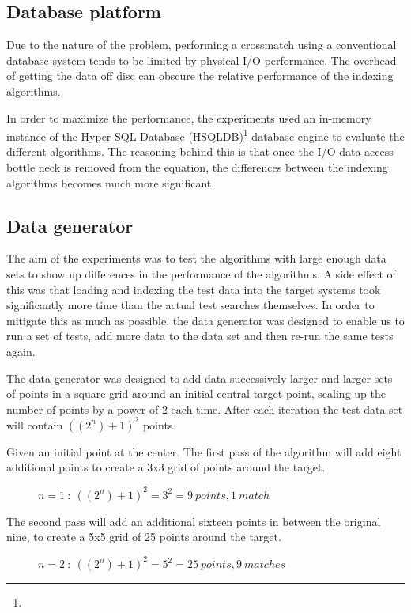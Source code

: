 \documentclass{article}
\newcommand{\hsqldb} {HSQLDB\xspace}
\newcommand{\crossmatch} {crossmatch\xspace}
\newcommand{\footurl}[1] {\footnote{\burl{#1}}}
\begin{document}
\subsection{Database platform}
\label{database-platform}

Due to the nature of the problem, performing a \crossmatch using a conventional database system tends to be limited by physical I/O performance. The overhead of getting the data off disc can obscure the relative performance of the indexing algorithms.

In order to maximize the performance, the experiments used an in-memory instance of the Hyper SQL Database (\hsqldb)\footurl{http://hsqldb.org/} database engine to evaluate the different algorithms. The reasoning behind this is that once the I/O data access bottle neck is removed from the equation, the differences between the indexing algorithms becomes much more significant.

\subsection{Data generator}
\label{test-data-generator}

The aim of the experiments was to test the algorithms with large enough data sets to show up differences in the performance of the algorithms.
A side effect of this was that loading and indexing the test data into the target systems took significantly more time than the actual test searches themselves.
In order to mitigate this as much as possible, the data generator was designed to enable us to run a set of tests, add more data to the data set and then re-run the same tests again.

The data generator was designed to add data successively larger and larger sets of points in a square grid around an initial central target point, scaling up the number of points by a power of 2 each time.
After each iteration the test data set will contain \(((2^n)+1)^2\) points.

Given an initial point at the center. The first pass of the algorithm will add eight additional points to create a 3x3 grid of points around the target. 
\begin{figure}[h]

\caption{$n=1 \ :\ ((2^n)+1)^2 = 3^2 = 9 \ points, 1 \ match$}
\label{fig:data-count-03}
\end{figure}

The second pass will add an additional sixteen points in between the original nine, to create a 5x5 grid of 25 points around the target. 
\begin{figure}[h]

\caption{$n=2 \ :\ ((2^n)+1)^2 = 5^2 = 25 \ points, 9 \ matches$}
\label{fig:data-count-03}
\end{figure}
\end{document}
